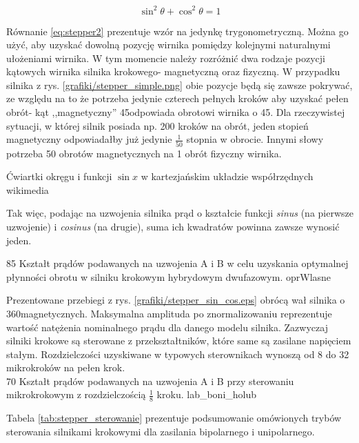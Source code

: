 \begin{equation} \label{eq:stepper2}
	\sin^2\theta + \cos^2\theta = 1
\end{equation}

Równanie \ref{eq:stepper2} prezentuje wzór na jedynkę trygonometryczną. Można go użyć, aby uzyskać dowolną pozycję wirnika pomiędzy kolejnymi naturalnymi ułożeniami wirnika. W tym momencie należy rozróżnić dwa rodzaje pozycji kątowych wirnika silnika krokowego- magnetyczną oraz fizyczną. W przypadku silnika z rys. \ref{grafiki/stepper_simple.png} obie pozycje będą się zawsze pokrywać, ze względu na to że potrzeba jedynie czterech pełnych kroków aby uzyskać pełen obrót- kąt ,,magnetyczny'' 45\degree odpowiada obrotowi wirnika o 45\degree. Dla rzeczywistej sytuacji, w której silnik posiada np. 200 kroków na obrót, jeden stopień magnetyczny odpowiadałby już jedynie $ \frac{1}{50} $ stopnia w obrocie. Innymi słowy potrzeba 50 obrotów magnetycznych na 1 obrót fizyczny wirnika.

		{Ćwiartki okręgu i funkcji $ \sin x $ w kartezjańskim układzie współrzędnych}
		{wikimedia}
		
Tak więc, podając na uzwojenia silnika prąd o kształcie funkcji {\it sinus} (na pierwsze uzwojenie) i {\it cosinus} (na drugie), suma ich kwadratów powinna zawsze wynosić jeden. 

		{85}
		{Kształt prądów podawanych na uzwojenia A i B w celu uzyskania optymalnej płynności obrotu w silniku krokowym hybrydowym dwufazowym.}
		{oprWlasne}
		
Prezentowane przebiegi z rys. \ref{grafiki/stepper_sin_cos.eps} obrócą wał silnika o 360\degree magnetycznych. Maksymalna amplituda po znormalizowaniu reprezentuje wartość natężenia nominalnego prądu dla danego modelu silnika. Zazwyczaj silniki krokowe są sterowane z przekształtników, które same są zasilane napięciem stałym. Rozdzielczości uzyskiwane w typowych sterownikach wynoszą od 8 do 32 mikrokroków na pełen krok.  \\

		{70}
		{Kształt prądów podawanych na uzwojenia A i B przy sterowaniu mikrokrokowym z rozdzielczością $ \frac{1}{8} $ kroku.}
		{lab_boni_holub}
		
Tabela \ref{tab:stepper_sterowanie} prezentuje podsumowanie omówionych trybów sterowania silnikami krokowymi dla zasilania bipolarnego i unipolarnego.

